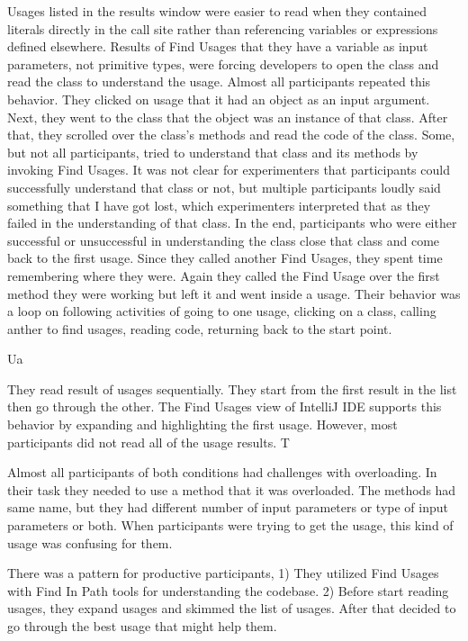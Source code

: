 \documentclass[conference]{IEEEtran}
\begin{document}
Usages listed in the results window were easier to read when they contained literals directly in the call site rather than referencing variables or expressions defined elsewhere. Results of Find Usages that they have a variable as input parameters, not primitive types, were forcing developers to open the class and read the class to understand the usage. Almost all participants repeated this behavior. They clicked on usage that it had an object as an input argument. Next, they went to the class that the object was an instance of that class. After that, they scrolled over the class's methods and read the code of the class. Some, but not all participants, tried to understand that class and its methods by invoking Find Usages. It was not clear for experimenters that participants could successfully understand that class or not, but multiple participants loudly said something that I have got lost, which experimenters interpreted that as they failed in the understanding of that class. In the end, participants who were either successful or unsuccessful in understanding the class close that class and come back to the first usage. Since they called another Find Usages, they spent time remembering where they were. Again they called the Find Usage over the first method they were working but left it and went inside a usage. Their behavior was a loop on following activities of going to one usage, clicking on a class, calling anther to find usages, reading code, returning back to the start point. \par

Ua\par

They read result of usages sequentially. They start from the first result in the list then go through the other.
The Find Usages view of IntelliJ IDE supports this behavior by expanding and highlighting the first usage. 
However, most participants did not read all of the usage results.  T\par


Almost all participants of both conditions had challenges with overloading. In their task they needed to use a method that it was overloaded. The methods had same name, but they had different number of input parameters or type of input parameters or both. When participants were trying to get the usage, this kind of usage was confusing for them.\par

There was a pattern for productive participants, 1) They utilized Find Usages with Find In Path tools for understanding the codebase.  2) Before start reading usages, they expand usages and skimmed the list of usages. After that decided to go through the best usage that might help them. \par
\end{document}
